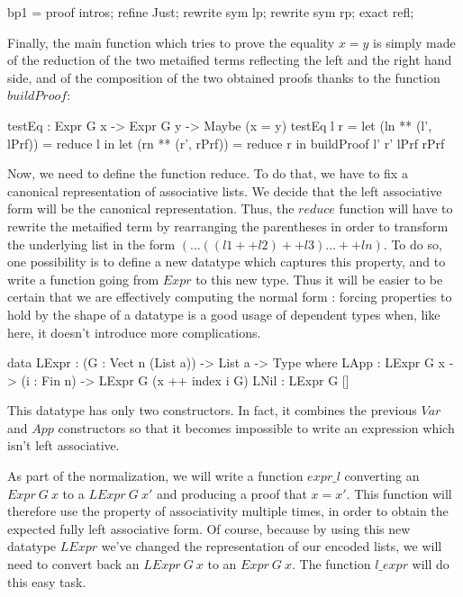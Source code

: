 \documentclass{sigplanconf}
\begin{document}
\begin{code}[caption=buildProof metavariable, captionpos=b, label=lst1:haskell2]
  bp1 = proof {
  intros;
  refine Just;
  rewrite sym lp;
  rewrite sym rp;
  exact refl;
}  
\end{code}
Finally, the main function which tries to prove the equality $x=y$ is simply made of the reduction of the two metaified terms reflecting the left and the right hand side, and of the composition of the two obtained proofs thanks to the function $buildProof$:
\begin{code}[caption=testEq, captionpos=b, label=lst1:haskell2]
  testEq : Expr G x -> Expr G y 
           -> Maybe (x = y)
  testEq l r = 
     let (ln ** (l', lPrf)) = reduce l in 
     let (rn ** (r', rPrf)) = reduce r in
        buildProof l' r' lPrf rPrf
\end{code}
Now, we need to define the function reduce. To do that, we have to fix a canonical representation of associative lists. We decide that the left associative form will be the canonical representation. Thus, the $reduce$ function will have to rewrite the metaified term by rearranging the parentheses in order to transform the underlying list in the form $(...((l1 ++ l2) ++ l3) ... ++ ln)$. To do so, one possibility is to define a new datatype which captures this property, and to write a function going from $Expr$ to this new type. Thus it will be easier to be certain that we are effectively computing the normal form : forcing properties to hold by the shape of a datatype is a good usage of dependent types when, like here, it doesn't introduce more complications.
\begin{code}[caption=Reflected left associative lists, captionpos=b, label=lst1:haskell2]
  data LExpr : (G : Vect n (List a)) -> 
               List a -> Type where
       LApp : LExpr G x -> (i : Fin n) -> 
              LExpr G (x ++ index i G)
       LNil : LExpr G []
\end{code}
This datatype has only two constructors. In fact, it combines the previous $Var$ and $App$ constructors so that it becomes impossible to write an expression which isn't left associative.
 
As part of the normalization, we will write a function $expr\_l$ converting an $Expr\ G\ x$ to a $LExpr\ G\ x'$ and producing a proof that $x=x'$. This function will therefore use the property of associativity multiple times, in order to obtain the expected fully left associative form. Of course, because by using this new datatype $LExpr$ we've changed the representation of our encoded lists, we will need to convert back an $LExpr\ G\ x$ to an $Expr\ G\ x$. The function $l\_expr$ will do this easy task.
\end{document}
